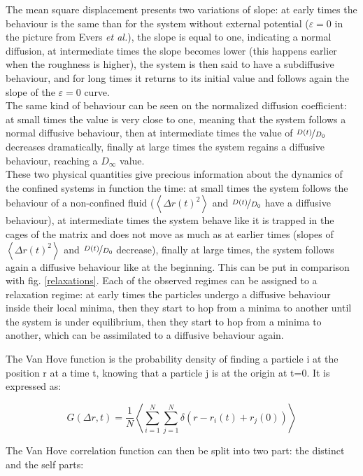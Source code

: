 \documentclass[a4paper,12pt]{article}
\newcommand{\jline}{\vspace{10pt}}
\newcommand{\etal}{\textit{et al.}}
\begin{document}
The mean square displacement presents two variations of slope: at early times the behaviour is the same than for the system without external potential ($\varepsilon = 0$ in the picture from Evers \etal), the slope is equal to one, indicating a normal diffusion, at intermediate times the slope becomes lower (this happens earlier when the roughness is higher), the system is then said to have a subdiffusive behaviour, and for long times it returns to its initial value and follows again the slope of the $\varepsilon = 0$ curve.\\
The same kind of behaviour can be seen on the normalized diffusion coefficient: at small times the value is very close to one, meaning that the system follows a normal diffusive behaviour, then at intermediate times the value of $\nicefrac{D(t)}{D_0}$ decreases dramatically, finally at large times the system regains a diffusive behaviour, reaching a $D_{\infty}$ value.\\
These two physical quantities give precious information about the dynamics of the confined systems in function the time: at small times the system follows the behaviour of a non-confined fluid ($\left< \Delta r(t)^2\right>$ and $\nicefrac{D(t)}{D_0}$ have a diffusive behaviour), at intermediate times the system behave like it is trapped in the cages of the matrix and does not move as much as at earlier times (slopes of $\left< \Delta r(t)^2\right>$ and $\nicefrac{D(t)}{D_0}$ decrease), finally at large times, the system follows again a diffusive behaviour like at the beginning. This can be put in comparison with fig. \ref{relaxations}. Each of the observed regimes can be assigned to a relaxation regime: at early times the particles undergo a diffusive behaviour inside their local minima, then they start to hop from a minima to another until the system is under equilibrium, then they start to hop from a minima to another, which can be assimilated to a diffusive behaviour again.\jline

The Van Hove function is the probability density of finding a particle i at the position r at a time t, knowing that a particle j is at the origin at t=0. It is expressed as:

\begin{equation}
G(\Delta r,t) = \frac{1}{N} \left< \sum_{i=1}^N \sum_{j=1}^N \delta(r-r_i(t)+r_j(0)) \right>
\end{equation}

The Van Hove correlation function can then be split into two part: the distinct and the self parts:
\end{document}
